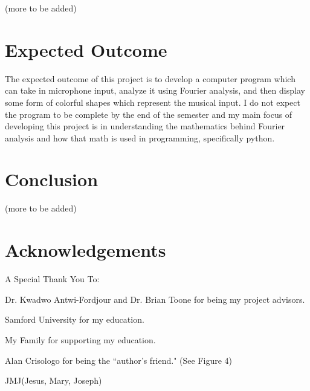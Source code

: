 \documentclass[10pt]{article}
\begin{document}
\noindent(more to be added)

\section{Expected Outcome}
\noindent\hspace{\parindent}The expected outcome of this project is to develop a computer program which can take in microphone input, analyze it using Fourier analysis, and then display some form of colorful shapes which represent the musical input. I do not expect the program to be complete by the end of the semester and my main focus of developing this project is in understanding the mathematics behind Fourier analysis and how that math is used in programming, specifically python.

\section{Conclusion}
\noindent(more to be added)

\section{Acknowledgements}
A Special Thank You To:

\vspace{2mm}\noindent\hspace{\parindent}Dr. Kwadwo Antwi-Fordjour and Dr. Brian Toone for being my project advisors.

\vspace{2mm}\noindent\hspace{\parindent}Samford University for my education.

\vspace{2mm}\noindent\hspace{\parindent}My Family for supporting my education.

\vspace{2mm}\noindent\hspace{\parindent}Alan Crisologo for being the \textquotedblleft author's friend." (See Figure 4)

\vspace{2mm}\noindent\hspace{\parindent}\Cross\hspace{1mm}JMJ\hspace{1mm}\Cross\hspace{2mm}(Jesus, Mary, Joseph)



\end{document}
